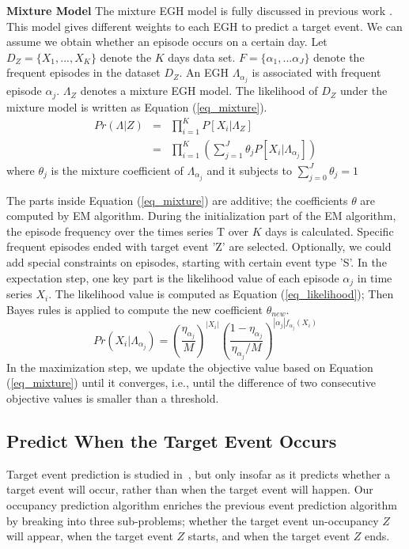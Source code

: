 \textbf{Mixture Model}
The mixture EGH model is fully discussed in previous work \cite{laxman2008stream}.
This model 
gives different weights to each EGH
to predict a target event. 
We can assume we obtain whether an episode occurs on a certain day. 
Let $D_Z=\{X_1,..., X_K\}$ denote the $K$ days data set. 
$F=\{\alpha_1, ... \alpha_J\}$ denote the frequent episodes in the dataset $D_Z$. 
An EGH $\Lambda_{\alpha_j}$ 
is associated with frequent episode $\alpha_j$.
$\Lambda_Z$ denotes a mixture EGH model. 
The likelihood of $D_Z$ under the mixture model is written as Equation (\ref{eq_mixture}).
\begin{eqnarray}
\label{eq_mixture}
Pr(\Lambda|Z) &=& \prod_{i=1}^K P[X_i|\Lambda_Z] \\
			&=& \prod_{i=1}^K ( \sum_{j=1}^J \theta_j P[X_i| \Lambda_{\alpha_j}])
\end{eqnarray}
where $\theta_j$ is the mixture coefficient of $\Lambda_{\alpha_j}$ and it subjects to 
$\sum_{j=0}^J \theta_j=1$ 

The parts inside Equation (\ref{eq_mixture}) are additive; 
the coefficients $\theta$ are computed by EM algorithm. 
%
During the initialization %
part of the EM algorithm, 
the episode frequency over the times series T over $K$ days is calculated. 
Specific frequent episodes ended with target event 'Z' are selected. 
Optionally, 
we could add special constraints on episodes, starting with 
certain event type 'S'. 
In the expectation step, 
one key part is the likelihood value of each episode $\alpha_j$ in time series $X_i$.
The likelihood value is computed as Equation (\ref{eq_likelihood});
Then Bayes rules is applied to compute the new coefficient $\theta_{new}$. 
\begin{equation}
\label{eq_likelihood}
Pr(X_i| \Lambda_{\alpha_j}) = (\frac{\eta_{\alpha_j}}{M})^{|X_i|} (\frac{1-\eta_{\alpha_j}}{\eta_{\alpha_j}/M})^{|\alpha_j|f_{\alpha_j}(X_i)}
\end{equation}
In the maximization step, 
we update the objective value based on Equation (\ref{eq_mixture}) until it converges, i.e., 
until the difference of two consecutive objective values 
is smaller than a threshold.%


\subsection{Predict When the Target Event Occurs}
Target event prediction is studied in~\cite{laxman2008stream},  
but only insofar as it predicts whether a target event will occur, 
rather than when the target event will happen. 
Our occupancy prediction algorithm enriches the previous 
event prediction algorithm by breaking into three sub-problems; whether the target event un-occupancy $Z$ will appear, when the target event $Z$ starts, and when the target event $Z$ ends. 

